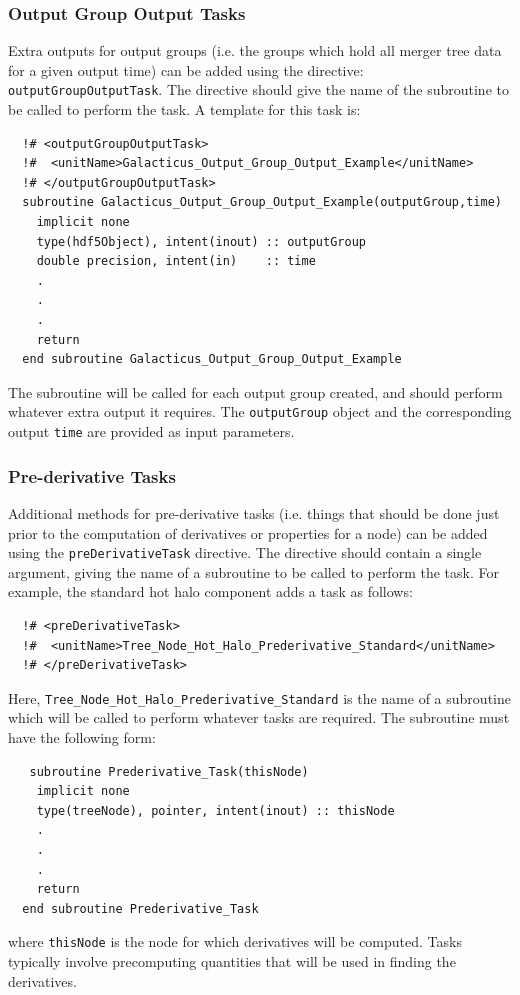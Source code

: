 \subsubsection{Output Group Output Tasks}

Extra outputs for output groups (i.e. the groups which hold all merger tree data for a given output time) can be added using the directive: {\tt outputGroupOutputTask}. The directive should give the name of the subroutine to be called to perform the task. A template for this task is:
\begin{verbatim}
  !# <outputGroupOutputTask>
  !#  <unitName>Galacticus_Output_Group_Output_Example</unitName>
  !# </outputGroupOutputTask>
  subroutine Galacticus_Output_Group_Output_Example(outputGroup,time)
    implicit none
    type(hdf5Object), intent(inout) :: outputGroup
    double precision, intent(in)    :: time
    .
    .
    .
    return
  end subroutine Galacticus_Output_Group_Output_Example
\end{verbatim}
The subroutine will be called for each output group created, and should perform whatever extra output it requires. The {\tt outputGroup} object and the corresponding output {\tt time} are provided as input parameters.

\subsubsection{Pre-derivative Tasks}

Additional methods for pre-derivative tasks (i.e. things that should be done just prior to the computation of derivatives or properties for a node) can be added using the {\tt preDerivativeTask} directive. The directive should contain a single argument, giving the name of a subroutine to be called to perform the task. For example, the standard hot halo component adds a task as follows:
\begin{verbatim}
  !# <preDerivativeTask>
  !#  <unitName>Tree_Node_Hot_Halo_Prederivative_Standard</unitName>
  !# </preDerivativeTask>
\end{verbatim}
Here, {\tt Tree\_Node\_Hot\_Halo\_Prederivative\_Standard} is the name of a subroutine which will be called to perform whatever tasks are required. The subroutine must have the following form:
\begin{verbatim}
   subroutine Prederivative_Task(thisNode)
    implicit none
    type(treeNode), pointer, intent(inout) :: thisNode
    .
    .
    .
    return
  end subroutine Prederivative_Task
\end{verbatim}
where {\tt thisNode} is the node for which derivatives will be computed. Tasks typically involve precomputing quantities that will be used in finding the derivatives.

